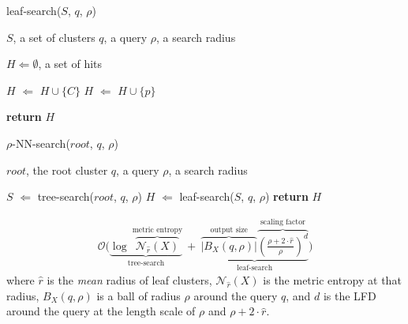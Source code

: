 \begin{minipage}{0.35\textwidth}
\begin{algorithm}[H]
    \caption{leaf-search($S$, $q$, $\rho$)}
    \label{alg:methods:rnn-search:leaf-search}
    \begin{tiny}
    \begin{algorithmic}[0]
        \Require $S$, a set of clusters
        \Require $q$, a query
        \Require $\rho$, a search radius

        \State $H \Leftarrow \emptyset$, a set of hits

                \State $H$ $\Leftarrow$ $H \cup \{C\}$
            \Else
                        \State $H$ $\Leftarrow$ $H \cup \{p\}$
                    \EndIf
                \EndFor
            \EndIf
        \EndFor

        \State \textbf{return} $H$
    \end{algorithmic}
    \end{tiny}
\end{algorithm}
\end{minipage}

\begin{algorithm}
    \caption{$\rho$-NN-search($root$, $q$, $\rho$)}
    \label{alg:methods:rnn-search}
    \begin{tiny}
    \begin{algorithmic}
        \Require $root$, the root cluster
        \Require $q$, a query
        \Require $\rho$, a search radius

        \State $S$ $\Leftarrow$ tree-search($root$, $q$, $\rho$)
        \State $H$ $\Leftarrow$ leaf-search($S$, $q$, $\rho$)
        \State \textbf{return} $H$
    \end{algorithmic}
    \end{tiny}
\end{algorithm}

\begin{gather}
    \mathcal{O}
    \Bigg(
        \underbrace{
            \log~\overbrace{\mathcal{N}_{\hat{r}}(X)}^{\textrm{metric entropy}}
        }_{\textrm{tree-search}}
        \ + \
        \underbrace{
            \overbrace{ \big| B_X(q, \rho) \big|}^{\textrm{output size}}
            \overbrace{ \left( \frac{\rho + 2 \cdot \hat{r}}{ \rho} \right) ^ d}^{\textrm{scaling factor}}
        }_{\textrm{leaf-search}}
    \Bigg)
    \label{eq:methods:rnn-search-complexity}
\end{gather}
where $\hat{r}$ is the \textit{mean} radius of leaf clusters, $\mathcal{N}_{\hat{r}}(X)$ is the metric entropy at that radius, $B_X(q, \rho)$ is a ball of radius $\rho$ around the query $q$, and $d$ is the LFD around the query at the length scale of $\rho$ and $\rho + 2 \cdot \hat{r}$.

